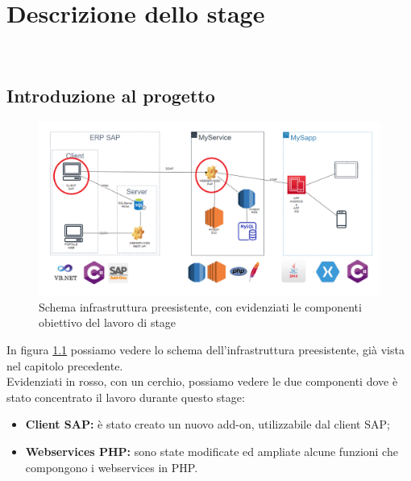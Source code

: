 
\chapter{Descrizione dello stage}
\label{cap:descrizione-stage}

\\

\section{Introduzione al progetto}
\begin{figure}[!h] 
	\centering 
	\includegraphics[scale = 0.5]{immagini/obiettivi-stage.png} 
	\caption{Schema infrastruttura preesistente, con evidenziati le componenti obiettivo del lavoro di stage}
	\label{fig:3-1}
\end{figure}
\newpage
\begin{flushleft}
	In figura \ref{fig:3-1} possiamo vedere lo schema dell'infrastruttura preesistente, già vista nel capitolo precedente.\\
	Evidenziati in rosso, con un cerchio, possiamo vedere le due componenti dove è stato concentrato il lavoro durante questo stage:
\end{flushleft}

\begin{itemize}
	\item \textbf{Client SAP:} è stato creato un nuovo add-on, utilizzabile dal client SAP;
	\item \textbf{Webservices PHP:} sono state modificate ed ampliate alcune funzioni che compongono i webservices in PHP.
\end{itemize}
